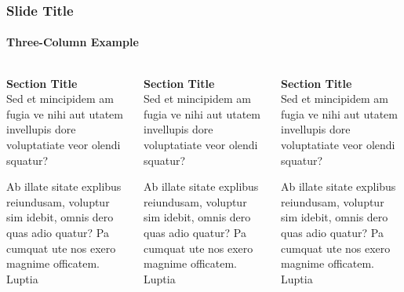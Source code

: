 \documentclass[
	aspectratio=169, %
	t, %
	onlytextwidth, %
	10pt, %
]{beamer}
\begin{document}

\begin{frame}
	\frametitle{Slide Title}
	\framesubtitle{Three-Column Example}
	
	\small %
	
	\begin{columns}[T] %
		\begin{column}{0.3\linewidth} %
			\textbf{Section Title}\\
			Sed et mincipidem am fugia ve nihi aut utatem invellupis dore voluptatiate veor olendi squatur?

			Ab illate sitate explibus reiundusam, voluptur sim idebit, omnis dero quas adio quatur? Pa cumquat ute nos exero magnime officatem. Luptia
		\end{column}
		\begin{column}{0.3\linewidth} %
			\textbf{Section Title}\\
			Sed et mincipidem am fugia ve nihi aut utatem invellupis dore voluptatiate veor olendi squatur?

			Ab illate sitate explibus reiundusam, voluptur sim idebit, omnis dero quas adio quatur? Pa cumquat ute nos exero magnime officatem. Luptia
		\end{column}
		\begin{column}{0.3\linewidth} %
			\textbf{Section Title}\\
			Sed et mincipidem am fugia ve nihi aut utatem invellupis dore voluptatiate veor olendi squatur?

			Ab illate sitate explibus reiundusam, voluptur sim idebit, omnis dero quas adio quatur? Pa cumquat ute nos exero magnime officatem. Luptia
		\end{column}
	\end{columns}
\end{frame}

\end{document}
